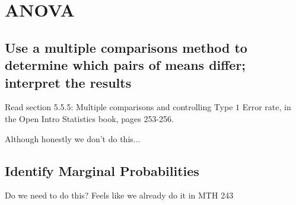 \setcounter{chapter}{13}
\chapter{ANOVA}

\section{Use a multiple comparisons method to determine which pairs of means differ; interpret the results}

Read section 5.5.5: Multiple comparisons and controlling Type \(1\) Error rate, in the Open Intro Statistics book, pages 253-256.

Although honestly we don't do this...

\section{Identify Marginal Probabilities} 

Do we need to do this?  Feels like we already do it in MTH 243

